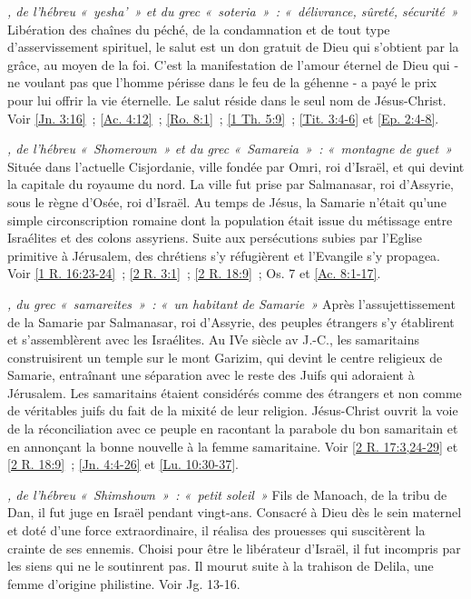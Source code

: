 \begin{multicols}{2}
\textit{, de l'hébreu «~yesha'~» et du grec «~soteria~»~: «~délivrance, sûreté, sécurité~»}\newline
Libération des chaînes du péché, de la condamnation et de tout type d'asservissement spirituel, le salut est un don gratuit de Dieu qui s'obtient par la grâce, au moyen de la foi. C'est la manifestation de l'amour éternel de Dieu qui - ne voulant pas que l'homme périsse dans le feu de la géhenne - a payé le prix pour lui offrir la vie éternelle. Le salut réside dans le seul nom de Jésus-Christ. Voir \vref{Jn. 3:16}~; \vref{Ac. 4:12}~; \vref{Ro. 8:1}~; \vref{1 Th. 5:9}~; \vref{Tit. 3:4-6} et \vref{Ep. 2:4-8}.

\textit{, de l'hébreu «~Shomerown~» et du grec «~Samareia~»~: «~montagne de guet~»}\newline
Située dans l'actuelle Cisjordanie, ville fondée par Omri, roi d'Israël, et qui devint la capitale du royaume du nord. La ville fut prise par Salmanasar, roi d'Assyrie, sous le règne d'Osée, roi d'Israël. Au temps de Jésus, la Samarie n'était qu'une simple circonscription romaine dont la population était issue du métissage entre Israélites et des colons assyriens. Suite aux persécutions subies par l'Eglise primitive à Jérusalem, des chrétiens s'y réfugièrent et l'Evangile s'y propagea. Voir \vref{1 R. 16:23-24}~; \vref{2 R. 3:1}~; \vref{2 R. 18:9}~; Os. 7 et \vref{Ac. 8:1-17}.

\textit{, du grec «~samareites~»~: «~un habitant de Samarie~»}\newline
Après l'assujettissement de la Samarie par Salmanasar, roi d'Assyrie, des peuples étrangers s'y établirent et s'assemblèrent avec les Israélites. Au IVe siècle av J.-C., les samaritains construisirent un temple sur le mont Garizim, qui devint le centre religieux de Samarie, entraînant une séparation avec le reste des Juifs qui adoraient à Jérusalem. Les samaritains étaient considérés comme des étrangers et non comme de véritables juifs du fait de la mixité de leur religion. Jésus-Christ ouvrit la voie de la réconciliation avec ce peuple en racontant la parabole du bon samaritain et en annonçant la bonne nouvelle à la femme samaritaine. Voir \vref{2 R. 17:3,24-29} et \vref{2 R. 18:9}~; \vref{Jn. 4:4-26} et \vref{Lu. 10:30-37}.

\textit{, de l'hébreu «~Shimshown~»~: «~petit soleil~»}\newline
Fils de Manoach, de la tribu de Dan, il fut juge en Israël pendant vingt-ans. Consacré à Dieu dès le sein maternel et doté d'une force extraordinaire, il réalisa des prouesses qui suscitèrent la crainte de ses ennemis. Choisi pour être le libérateur d'Israël, il fut incompris par les siens qui ne le soutinrent pas. Il mourut suite à la trahison de Delila, une femme d'origine philistine. Voir Jg. 13-16.


\end{multicols}
